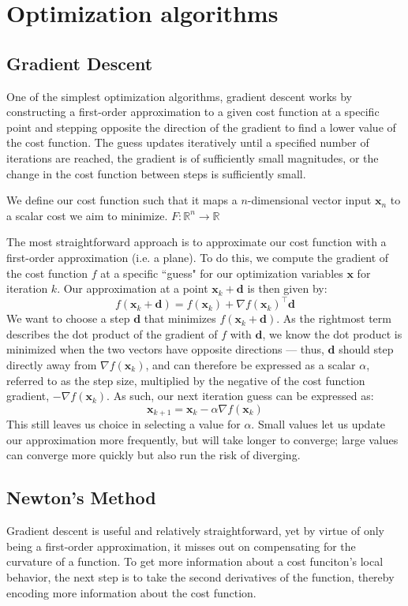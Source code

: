 \documentclass[12pt]{article}
\begin{document}
\section{Optimization algorithms}

\subsection{Gradient Descent}
One of the simplest optimization algorithms, gradient descent works by constructing a first-order
approximation to a given cost function at a specific point and stepping opposite the direction of the 
gradient to find a lower value of the cost function. The guess updates iteratively until a specified number of
iterations are reached, the gradient is of sufficiently small magnitudes, or the change in the cost function
between steps is sufficiently small. 

We define our cost function such that it maps a \(n\)-dimensional vector input \(\mathbf{x}_n\)
to a scalar cost we aim to minimize. \(F : \mathbb{R}^n \to \mathbb{R}\)

The most straightforward approach is to approximate our cost function with a first-order approximation (i.e. a plane).
To do this, we compute the gradient of the cost function \(f\) at a specific ``guess" for our optimization variables
\(\mathbf{x}\) for iteration \(k\). Our approximation at a point \(\mathbf{x}_k + \mathbf{d}\) is then given by:
\[f(\mathbf{x}_k + \mathbf{d}) = f(\mathbf{x}_k) + \nabla f(\mathbf{x}_k)^\top \mathbf{d}\]
We want to choose a step \(\mathbf{d}\) that minimizes \(f(\mathbf{x}_k + \mathbf{d})\). As the rightmost term describes
the dot product of the gradient of \(f\) with \(\mathbf{d}\), we know the dot product is minimized when the two
vectors have opposite directions --- thus, \(\mathbf{d}\) should step directly away from 
\(\nabla f(\mathbf{x}_k)\), and can therefore be expressed as a scalar \(\alpha\), referred to as the step size,
multiplied by the negative of the cost function gradient, \(-\nabla f(\mathbf{x}_k)\). As such, our next iteration guess 
can be expressed as:
\[\mathbf{x}_{k+1} = \mathbf{x}_k - \alpha \nabla f(\mathbf{x}_k)\]
This still leaves us choice in selecting a value for \(\alpha\). Small values let us update our approximation more frequently,
but will take longer to converge; large values can converge more quickly but also run the risk of diverging.

\subsection{Newton's Method}
Gradient descent is useful and relatively straightforward, yet by virtue of only being a first-order approximation,
it misses out on compensating for the curvature of a function. To get more information about a cost funciton's local
behavior, the next step is to take the second derivatives of the function, thereby encoding more information about the
cost function. 
\end{document}
